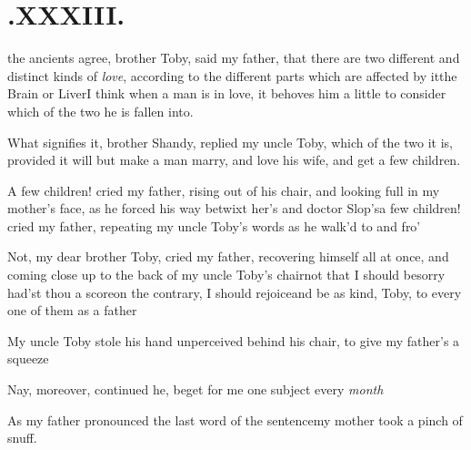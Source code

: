 \documentclass[twoside]{article}
\begin{document}
\vfill{}\eject\null
\section{.\enspace XXXIII.}

 the ancients agree, brother Toby, said my father, that there are two
different and distinct kinds of \textit{love}, according to the different parts
which are affected by it\tsk the Brain or Liver\tsh I think when a man is in love, it
behoves him a little to consider which of the two he is fallen into.

What signifies it, brother Shandy, replied my uncle
Toby, which of the two it is, provided it will
but make a man marry, and love his wife, and get
a few children.

\tsh A few children! cried my father, rising out of his
chair, and looking full in my mother’s face, as he forced his
way betwixt her’s and doctor Slop’s\tsk a few children! cried my father, repeating my uncle
Toby’s words as he walk’d to and
fro’\tsh

\tsh Not, my dear brother Toby, cried my father, recovering
himself all at once, and coming close up to the back of my uncle
Toby’s chair\tsk not that I should be\break sorry had’st thou a
score\tsk on the contrary, I should rejoice\tsk and be as kind,
Toby, to every one of them as a father\tsk 

My uncle Toby stole his hand unperceived behind his
chair, to give my father’s a squeeze\tsh

\tsh Nay, moreover, continued he,\break
{}
beget for me one subject every \textit{month}\tsh

As my father pronounced the last word of the sentence\tsk my
mother took a pinch of snuff.
\end{document}
